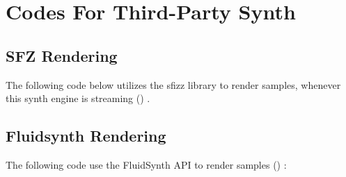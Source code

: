 \section{Codes For Third-Party Synth}
\label{app:fs_sfz_render}

\subsection{SFZ Rendering}

The following code below utilizes the sfizz library to render samples,
whenever this synth engine is streaming () \cite{openai_chatgpt}.




\subsection{Fluidsynth Rendering}

The following code use the FluidSynth API to render samples () \cite{openai_chatgpt}:

